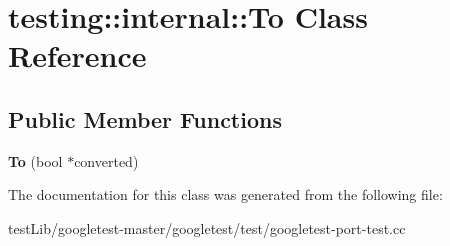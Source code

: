 \hypertarget{classtesting_1_1internal_1_1To}{}\section{testing\+:\+:internal\+:\+:To Class Reference}
\label{classtesting_1_1internal_1_1To}
\subsection*{Public Member Functions}
\begin{DoxyCompactItemize}
\item 
\mbox{\label{classtesting_1_1internal_1_1To_a447354e55d855ed0f1a1de8b2b54d345}} 
{\bfseries To} (bool $\ast$converted)
\end{DoxyCompactItemize}


The documentation for this class was generated from the following file\+:\begin{DoxyCompactItemize}
\item 
test\+Lib/googletest-\/master/googletest/test/googletest-\/port-\/test.\+cc\end{DoxyCompactItemize}
